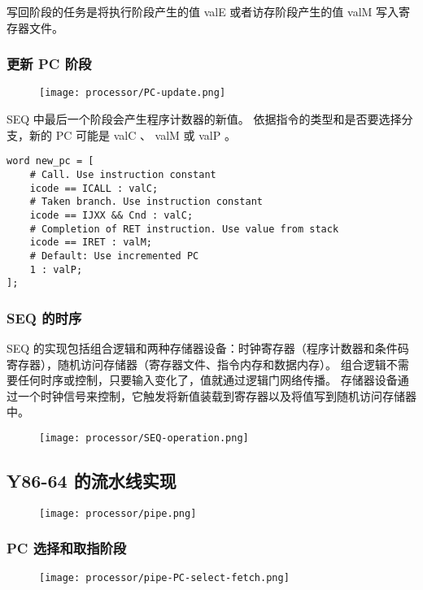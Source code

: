 写回阶段的任务是将执行阶段产生的值 valE 或者访存阶段产生的值 valM 写入寄存器文件。

\subsubsection{更新 PC 阶段}
\begin{figure}[H]
    \centering
    \texttt{[image: processor/PC-update.png]}
\end{figure}

SEQ 中最后一个阶段会产生程序计数器的新值。
依据指令的类型和是否要选择分支，新的 PC 可能是 valC 、 valM 或 valP 。
\begin{lstlisting}[style=CStyle]
word new_pc = [
    # Call. Use instruction constant
    icode == ICALL : valC;
    # Taken branch. Use instruction constant
    icode == IJXX && Cnd : valC;
    # Completion of RET instruction. Use value from stack
    icode == IRET : valM;
    # Default: Use incremented PC
    1 : valP;
];
\end{lstlisting}

\subsubsection{SEQ 的时序}

SEQ 的实现包括组合逻辑和两种存储器设备：时钟寄存器（程序计数器和条件码寄存器），随机访问存储器（寄存器文件、指令内存和数据内存）。
组合逻辑不需要任何时序或控制，只要输入变化了，值就通过逻辑门网络传播。
存储器设备通过一个时钟信号来控制，它触发将新值装载到寄存器以及将值写到随机访问存储器中。

\begin{figure}[H]
    \centering
    \texttt{[image: processor/SEQ-operation.png]}
\end{figure}

\subsection{Y86-64 的流水线实现}
\begin{figure}[H]
    \centering
    \texttt{[image: processor/pipe.png]}
\end{figure}

\subsubsection{PC 选择和取指阶段}
\begin{figure}[H]
    \centering
    \texttt{[image: processor/pipe-PC-select-fetch.png]}
\end{figure}

